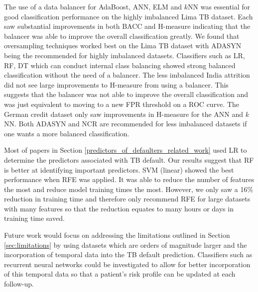 \documentclass{sig-alternate-05-2015}
\begin{document}
	The use of a data balancer for AdaBoost, ANN, ELM and $k$NN was essential for good classification performance on the highly imbalanced Lima TB dataset. Each saw substantial improvements in both BACC and H-measure indicating that the balancer was able to improve the overall classification greatly. We found that oversampling techniques worked best on the Lima TB dataset with ADASYN being the recommended for highly imbalanced datasets. Classifiers such as LR, RF, DT which can conduct internal class balancing showed strong balanced classification without the need of a balancer. The less imbalanced India attrition did not see large improvements to H-measure from using a balancer. This suggests that the balancer was not able to improve the overall classification and was just equivalent to moving to a new FPR threshold on a ROC curve. The German credit dataset only saw improvements in H-measure for the ANN and $k$NN. Both ADASYN and NCR are recommended for less imbalanced datasets if one wants a more balanced classification.
		
	Most of papers in Section \ref{predictors_of_defaulters_related_work} used LR to determine the predictors associated with TB default. Our results suggest that RF is better at identifying important predictors. SVM (linear) showed the best performance when RFE was applied. It was able to reduce the number of features the most and reduce model training times the most. However, we only saw a 16\% reduction in training time and therefore only recommend RFE for large datasets with many features so that the reduction equates to many hours or days in training time saved.
	
	Future work would focus on addressing the limitations outlined in Section \ref{sec:limitations} by using datasets which are orders of magnitude larger and the incorporation of temporal data into the TB default prediction. Classifiers such as recurrent neural networks could be investigated to allow for better incorporation of this temporal data so that a patient's risk profile can be updated at each follow-up.
	
	
	
	
\end{document}

